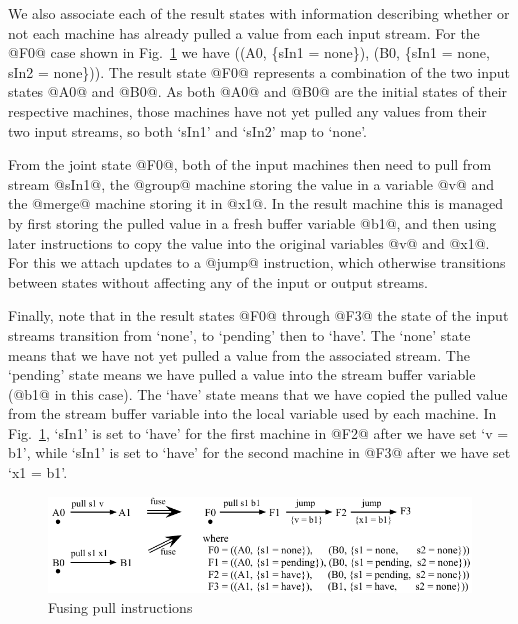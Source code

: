 We also associate each of the result states with information describing whether or not each machine has already pulled a value from each input stream. For the @F0@ case shown in Fig.~\ref{fig:Fusion:Pulls} we have ((A0, \{sIn1 = none\}), (B0, \{sIn1 = none, sIn2 = none\})). The result state @F0@ represents a combination of the two input states @A0@ and @B0@. As both @A0@ and @B0@ are the initial states of their respective machines, those machines have not yet pulled any values from their two input streams, so both `sIn1' and `sIn2' map to `none'.

From the joint state @F0@, both of the input machines then need to pull from stream @sIn1@, the @group@ machine storing the value in a variable @v@ and the @merge@ machine storing it in @x1@. In the result machine this is managed by first storing the pulled value in a fresh buffer variable @b1@, and then using later instructions to copy the value into the original variables @v@ and @x1@. For this we attach updates to a @jump@ instruction, which otherwise transitions between states without affecting any of the input or output streams.

Finally, note that in the result states @F0@ through @F3@ the state of the input streams transition from `none', to `pending' then to `have'. The `none' state means that we have not yet pulled a value from the associated stream. The `pending' state means we have pulled a value into the stream buffer variable (@b1@ in this case). The `have' state means that we have copied the pulled value from the stream buffer variable into the local variable used by each machine. In Fig.~\ref{fig:Fusion:Pulls},  `sIn1' is set to `have' for the first machine in @F2@ after we have set `v = b1', while `sIn1' is set to `have' for the second machine in @F3@ after we have set `x1 = b1'. 


\begin{figure}
\includegraphics[scale=1.1]{figures/fuse-pull-pull.pdf}
\caption{Fusing pull instructions}
\label{fig:Fusion:Pulls}
\end{figure}


